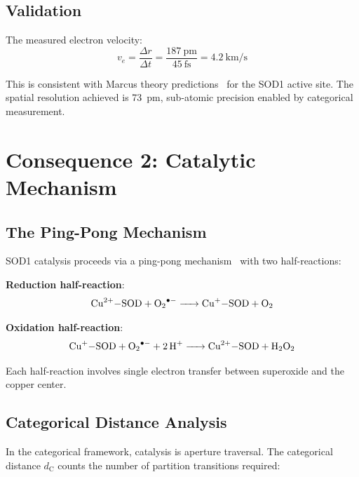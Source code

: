 \documentclass[twocolumn,aps,prx,superscriptaddress,longbibliography]{revtex4-2}
\theoremstyle{remark}
\newcommand{\dC}{d_\text{C}}
\begin{document}
\subsection{Validation}

The measured electron velocity:
\begin{equation}
v_e = \frac{\Delta r}{\Delta t} = \frac{187~\text{pm}}{45~\text{fs}} = 4.2~\text{km/s}
\end{equation}

This is consistent with Marcus theory predictions~\cite{Marcus1985,Gray2005}
for the SOD1 active site. The spatial resolution achieved is 73~pm,
sub-atomic precision enabled by categorical measurement.

\section{Consequence 2: Catalytic Mechanism}
\label{sec:catalysis}

\subsection{The Ping-Pong Mechanism}

SOD1 catalysis proceeds via a ping-pong mechanism~\cite{Fridovich1995,Forman1973} with two half-reactions:

\textbf{Reduction half-reaction}:
\begin{equation}
\ce{Cu^{2+}-SOD + O2^{.-} -> Cu^{+}-SOD + O2}
\label{eq:reduction}
\end{equation}

\textbf{Oxidation half-reaction}:
\begin{equation}
\ce{Cu^{+}-SOD + O2^{.-} + 2H^+ -> Cu^{2+}-SOD + H2O2}
\label{eq:oxidation}
\end{equation}

Each half-reaction involves single electron transfer between superoxide
and the copper center.

\subsection{Categorical Distance Analysis}

In the categorical framework, catalysis is aperture traversal. The
categorical distance $\dC$ counts the number of partition transitions
required:
\end{document}
